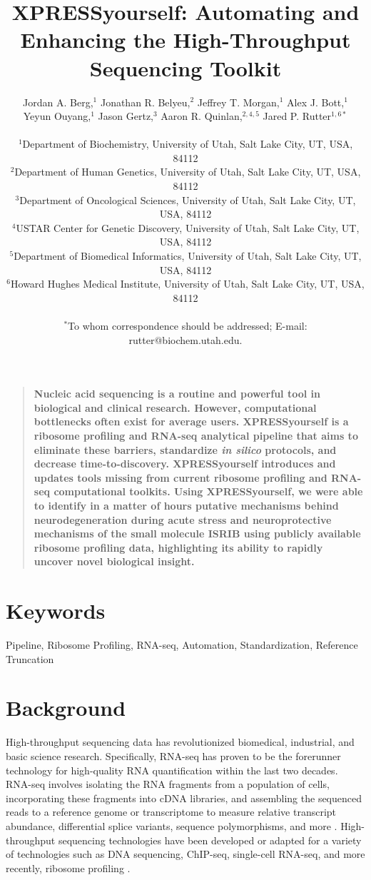 \documentclass[11pt, a4paper, oneside]{article}
\title{
XPRESSyourself: Automating and Enhancing the High-Throughput Sequencing Toolkit
}
\author{
Jordan A. Berg,$^{1}$ Jonathan R. Belyeu,$^{2}$ Jeffrey T. Morgan,$^{1}$ Alex J. Bott,$^{1}$\\
Yeyun Ouyang,$^{1}$ Jason Gertz,$^{3}$ Aaron R. Quinlan,$^{2,4,5}$ Jared P. Rutter$^{1,6\ast}$\\
\\
\normalsize{$^{1}$Department of Biochemistry, University of Utah, Salt Lake City, UT, USA, 84112}\\
\normalsize{$^{2}$Department of Human Genetics, University of Utah, Salt Lake City, UT, USA, 84112}\\
\normalsize{$^{3}$Department of Oncological Sciences, University of Utah, Salt Lake City, UT, USA, 84112}\\
\normalsize{$^{4}$USTAR Center for Genetic Discovery, University of Utah, Salt Lake City, UT, USA, 84112}\\
\normalsize{$^{5}$Department of Biomedical Informatics, University of Utah, Salt Lake City, UT, USA, 84112}\\
\normalsize{$^{6}$Howard Hughes Medical Institute, University of Utah, Salt Lake City, UT, USA, 84112}\\
\\
\normalsize{$^\ast$To whom correspondence should be addressed; E-mail: rutter@biochem.utah.edu.}
}
\date{}
\newenvironment{sciabstract}{%
\begin{quote} \bf}
{\end{quote}}
\begin{document}
\baselineskip24pt

\maketitle



\begin{sciabstract}
Nucleic acid sequencing is a routine and powerful tool in biological and clinical research. However, computational bottlenecks often exist for average users. XPRESSyourself is a ribosome profiling and RNA-seq analytical pipeline that aims to eliminate these barriers, standardize \textit{in silico} protocols, and decrease time-to-discovery. XPRESSyourself introduces and updates tools missing from current ribosome profiling and RNA-seq computational toolkits. Using XPRESSyourself, we were able to identify in a matter of hours putative mechanisms behind neurodegeneration during acute stress and neuroprotective mechanisms of the small molecule ISRIB using publicly available ribosome profiling data, highlighting its ability to rapidly uncover novel biological insight.
\end{sciabstract}

\section*{Keywords}
Pipeline, Ribosome Profiling, RNA-seq, Automation, Standardization, Reference Truncation

\section{Background}
High-throughput sequencing data has revolutionized biomedical, industrial, and basic science research. Specifically, RNA-seq has proven to be the forerunner technology for high-quality RNA quantification within the last two decades. RNA-seq involves isolating the RNA fragments from a population of cells, incorporating these fragments into cDNA libraries, and assembling the sequenced reads to a reference genome or transcriptome to measure relative transcript abundance, differential splice variants, sequence polymorphisms, and more \cite{byron_nrg}. High-throughput sequencing technologies have been developed or adapted for a variety of technologies such as DNA sequencing, ChIP-seq, single-cell RNA-seq, and more recently, ribosome profiling \cite{ingolia_science}. \par
\end{document}
